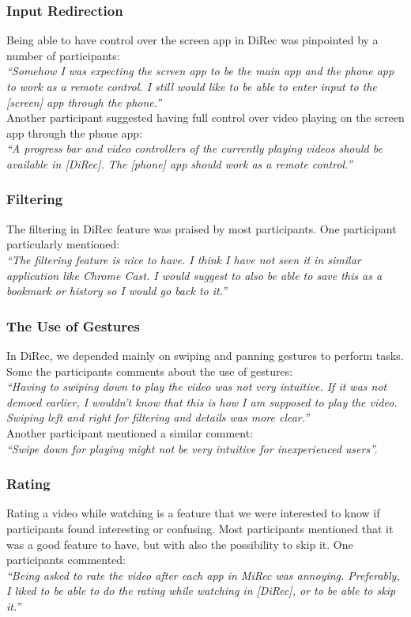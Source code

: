 \subsubsection{Input Redirection}
Being able to have control over the screen app in DiRec was pinpointed by a
number of participants:\\
\textit{``Somehow I was expecting the screen app to be the main app and
the phone app to work as a remote control. I still would like to be able to
enter input to the [screen] app through the phone.''}\\
Another participant suggested having full control over video playing on the
screen app through the phone app:\\
\textit{``A progress bar and video controllers of the currently playing
videos should be available in [DiRec]. The [phone] app should work as a remote
control.''}
\subsubsection{Filtering}
The filtering in DiRec feature was praised by most participants. One participant
particularly mentioned:\\
\textit{``The filtering feature is nice to have. I think I have not seen it in
similar application like Chrome Cast. I would suggest to also be able to save this as
a bookmark or history so I would go back to it.''}
\subsubsection{The Use of Gestures}
In DiRec, we depended mainly on swiping and panning gestures to perform tasks.
Some the participants comments about the use of gestures:\\
\textit{``Having to swiping down to play the video was not very intuitive. If it
was not demoed earlier, I wouldn't know that this is how I am supposed to play the
video. Swiping left and right for filtering and details was more clear.''}\\
Another participant mentioned a similar comment:\\
\textit{``Swipe down for playing might not be very intuitive for inexperienced
users''.}
\subsubsection{Rating}
Rating a video while watching is a feature that we were interested to
know if participants found interesting or confusing. Most participants
mentioned that it was a good feature to have, but with also the
possibility to skip it. One participants commented:\\
\textit{``Being asked to rate the video after each app in MiRec was
annoying. Preferably, I liked to be able to do the rating while watching in
[DiRec], or to be able to skip it.''}\\

